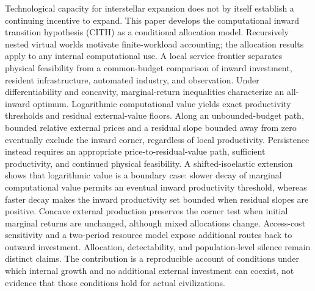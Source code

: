 Technological capacity for interstellar expansion does not by itself establish a continuing incentive to expand. This paper develops the computational inward transition hypothesis (CITH) as a conditional allocation model. Recursively nested virtual worlds motivate finite-workload accounting; the allocation results apply to any internal computational use. A local service frontier separates physical feasibility from a common-budget comparison of inward investment, resident infrastructure, automated industry, and observation. Under differentiability and concavity, marginal-return inequalities characterize an all-inward optimum. Logarithmic computational value yields exact productivity thresholds and residual external-value floors. Along an unbounded-budget path, bounded relative external prices and a residual slope bounded away from zero eventually exclude the inward corner, regardless of local productivity. Persistence instead requires an appropriate price-to-residual-value path, sufficient productivity, and continued physical feasibility. A shifted-isoelastic extension shows that logarithmic value is a boundary case: slower decay of marginal computational value permits an eventual inward productivity threshold, whereas faster decay makes the inward productivity set bounded when residual slopes are positive. Concave external production preserves the corner test when initial marginal returns are unchanged, although mixed allocations change. Access-cost sensitivity and a two-period resource model expose additional routes back to outward investment. Allocation, detectability, and population-level silence remain distinct claims. The contribution is a reproducible account of conditions under which internal growth and no additional external investment can coexist, not evidence that those conditions hold for actual civilizations.
